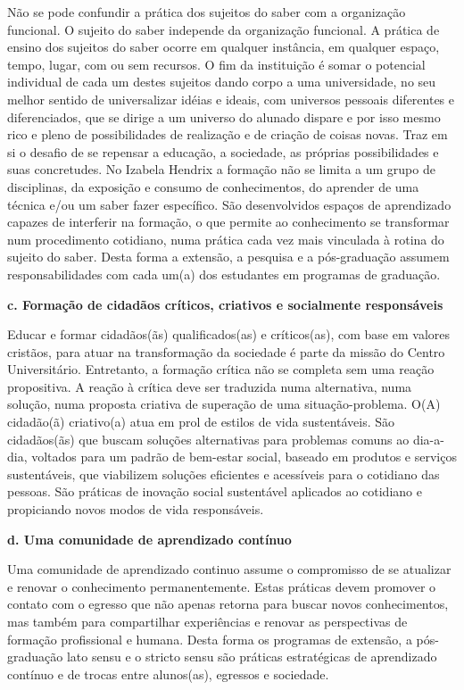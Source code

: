\documentclass[a4paper, 12pt, openright, oneside, german, french, english, brazil]{abntex2}
\begin{document}
Não se pode confundir a prática dos sujeitos do saber com a organização funcional. O sujeito do saber independe da organização funcional. A prática de ensino dos sujeitos do saber ocorre em qualquer instância, em qualquer espaço, tempo, lugar, com ou sem recursos. O fim da instituição é somar o potencial individual de cada um destes sujeitos dando corpo a uma universidade, no seu melhor sentido de universalizar idéias e ideais, com universos pessoais diferentes e diferenciados, que se dirige a um universo do alunado dispare e por isso mesmo rico e pleno de possibilidades de realização e de criação de coisas novas. Traz em si o desafio de se repensar a educação, a sociedade, as próprias possibilidades e suas concretudes. No Izabela Hendrix a formação não se limita a um grupo de disciplinas, da exposição e consumo de conhecimentos, do aprender de uma técnica e/ou um saber fazer específico. São desenvolvidos espaços de aprendizado capazes de interferir na formação, o que permite ao conhecimento se transformar num procedimento cotidiano, numa prática cada vez mais vinculada à rotina do sujeito do saber. Desta forma a extensão, a pesquisa e a pós-graduação assumem responsabilidades com cada um(a) dos estudantes em programas de graduação.

\textbf{c. Formação de cidadãos críticos, criativos e socialmente responsáveis}

Educar e formar cidadãos(ãs) qualificados(as) e críticos(as), com base em valores cristãos, para atuar na transformação da sociedade é parte da missão do Centro Universitário. Entretanto, a formação crítica não se completa sem uma reação propositiva. A reação à crítica deve ser traduzida numa alternativa, numa solução, numa proposta criativa de superação de uma situação-problema. O(A) cidadão(ã) criativo(a) atua em prol de estilos de vida sustentáveis. São cidadãos(ãs) que buscam soluções alternativas para problemas comuns ao dia-a-dia, voltados para um padrão de bem-estar social, baseado em produtos e serviços sustentáveis, que viabilizem soluções eficientes e acessíveis para o cotidiano das pessoas. São práticas de inovação social sustentável aplicados ao cotidiano e propiciando novos modos de vida responsáveis.

\textbf{d. Uma comunidade de aprendizado contínuo}

Uma comunidade de aprendizado continuo assume o compromisso de se atualizar e renovar o conhecimento permanentemente. Estas práticas devem promover o contato com o egresso que não apenas retorna para buscar novos conhecimentos, mas também para compartilhar experiências e renovar as perspectivas de formação profissional e humana. Desta forma os programas de extensão, a pós-graduação lato sensu e o stricto sensu são práticas estratégicas de aprendizado contínuo e de trocas entre alunos(as), egressos e sociedade.
\end{document}
